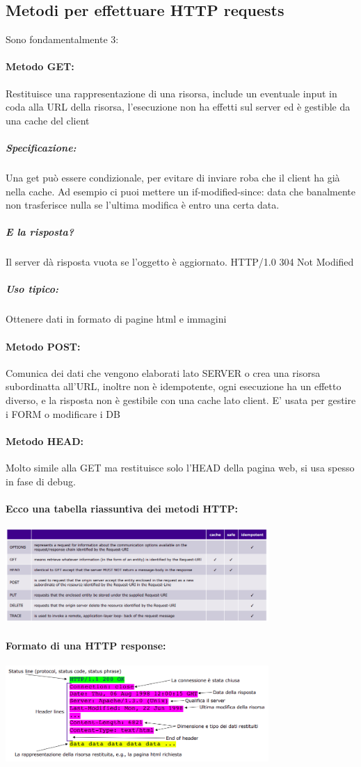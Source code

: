\documentclass[12pt, a4paper, openany, twoside]{book}
\begin{document}
\subsection{Metodi per effettuare HTTP requests}
Sono fondamentalmente 3:
\paragraph{Metodo GET:} Restituisce una rappresentazione di una risorsa, include
un eventuale input in coda alla URL della risorsa, l'esecuzione non ha effetti sul server
ed è gestible da una cache del client
\subparagraph{Specificazione: }Una get può essere condizionale, per evitare di 
inviare roba che il client ha già nella cache. Ad esempio ci puoi mettere un
if-modified-since: data che banalmente non trasferisce nulla se l'ultima modifica
è entro una certa data. 
\subparagraph{E la risposta?} Il server dà risposta vuota se l'oggetto è aggiornato.
HTTP/1.0 304 Not Modified 		
\subparagraph{Uso tipico:} Ottenere dati in formato di pagine html e immagini
\paragraph{Metodo POST:} Comunica dei dati che vengono elaborati lato SERVER o
crea una risorsa subordinatta all'URL, inoltre non è idempotente, ogni esecuzione
ha un effetto diverso, e la risposta non è gestibile con una cache lato client.
E' usata per gestire i FORM o modificare i DB
\paragraph{Metodo HEAD:} Molto simile alla GET ma restituisce solo l'HEAD della
pagina web, si usa spesso in fase di debug.
\paragraph{Ecco una tabella riassuntiva dei metodi HTTP:} 
\begin{center}
\includegraphics[width=0.75\textwidth]{4}
\end{center}	
\paragraph{Formato di una HTTP response:}
\begin{center}
\includegraphics[width=0.75\textwidth]{5}
\end{center}
\end{document}
